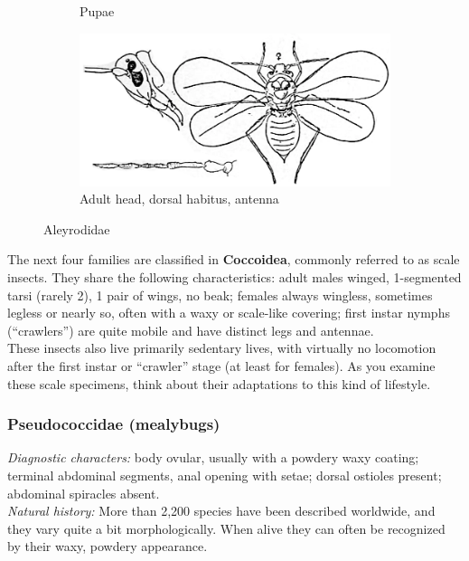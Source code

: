 \documentclass[letterpaper, 11pt]{article}
\begin{document}
\begin{figure}[ht!]
\begin{subfigure}[ht!]{0.3\textwidth}
  \caption{Pupae}
  \label{fig:aleyrodid2}
 \end{subfigure}
 \hfill
 \begin{subfigure}[ht!]{0.53\textwidth}
  \includegraphics[width=\textwidth]{aleyrodid3.png}
  \caption{Adult head, dorsal habitus, antenna}
  \label{fig:aleyrodid3}
 \end{subfigure}
 \caption{Aleyrodidae \citep[Modified from Figs. 8,9 in][]{bhlitem192425}}\label{fig:aleyrodid}
\end{figure}

\noindent{}The next four families are classified in \textbf{Coccoidea}, commonly referred to as scale insects. They share the following characteristics: adult males winged, 1-segmented tarsi (rarely 2), 1 pair of wings, no beak; females always wingless, sometimes legless or nearly so, often with a waxy or scale-like covering; first instar nymphs (``crawlers'') are quite mobile and have distinct legs and antennae.\\

\noindent{}These insects also live primarily sedentary lives, with virtually no locomotion after the first instar or ``crawler'' stage (at least for females). As you examine these scale specimens, think about their adaptations to this kind of lifestyle. \\

\subsubsection{Pseudococcidae (mealybugs)}
\noindent{}\textit{Diagnostic characters:} body ovular, usually with a powdery waxy coating; terminal abdominal segments, anal opening with setae; dorsal ostioles present; abdominal spiracles absent.\\

\noindent{}\textit{Natural history:} More than 2,200 species have been described worldwide, and they vary quite a bit morphologically. When alive they can often be recognized by their waxy, powdery appearance.\\
\end{document}
